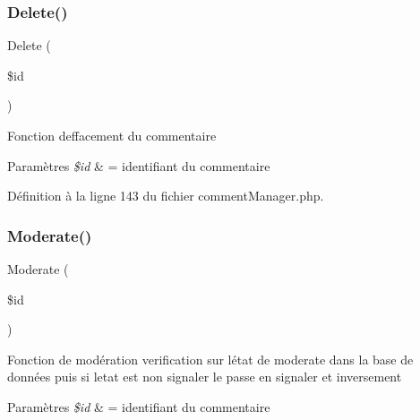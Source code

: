 \mbox{\label{class_src_1_1_managers_1_1comment_manager_a59113b5ecd1d155db6a4f30af34a1e80}} 
\subsubsection{\texorpdfstring{Delete()}{Delete()}}
{\footnotesize\ttfamily Delete (\begin{DoxyParamCaption}\item[{}]{\$id }\end{DoxyParamCaption})}

Fonction d\textquotesingle{}effacement du commentaire 
\begin{DoxyParams}{Paramètres}
{\em \$id} & = identifiant du commentaire \\
\hline
\end{DoxyParams}


Définition à la ligne 143 du fichier comment\+Manager.\+php.

\mbox{\label{class_src_1_1_managers_1_1comment_manager_a511df177d885f133ac59c2b68c7046f2}} 
\subsubsection{\texorpdfstring{Moderate()}{Moderate()}}
{\footnotesize\ttfamily Moderate (\begin{DoxyParamCaption}\item[{}]{\$id }\end{DoxyParamCaption})}

Fonction de modération verification sur létat de \textquotesingle{}moderate\textquotesingle{} dans la base de données puis si l\textquotesingle{}etat est non signaler le passe en signaler et inversement 
\begin{DoxyParams}{Paramètres}
{\em \$id} & = identifiant du commentaire \\
\hline
\end{DoxyParams}


